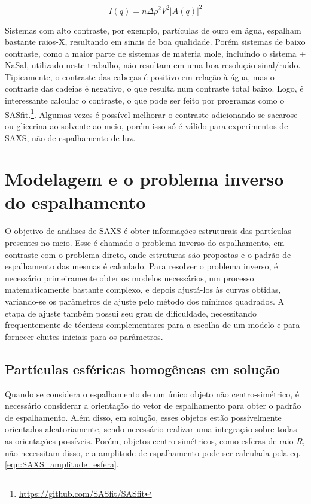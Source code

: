 		\begin{equation}
		I(q) = n\Delta \rho^2 V^2 |A(q)|^2
		\label{eqn:SAXS_I_funcao_A}
		\end{equation}
		
		Sistemas com alto contraste, por exemplo, partículas de ouro em água, espalham bastante raios-X, resultando em sinais de boa qualidade. Porém sistemas de baixo contraste, como a maior parte de sistemas de materia mole, incluindo o sistema \CTAB{} + NaSal, utilizado neste trabalho, não resultam em uma boa resolução sinal/ruído. Tipicamente, o contraste das cabeças é positivo em relação à água, mas o contraste das cadeias é negativo, o que resulta num contraste total baixo. Logo, é interessante calcular o contraste, o que pode ser feito por programas como o SASfit.\footnote{\url{https://github.com/SASfit/SASfit}}. Algumas vezes é possível melhorar o contraste adicionando-se sacarose ou glicerina ao solvente ao meio, porém isso só é válido para experimentos de SAXS, não de espalhamento de luz.
		
		\section{Modelagem e o problema inverso do espalhamento}
		
		O objetivo de análises de SAXS é obter informações estruturais das partículas presentes no meio. Esse é chamado o problema inverso do espalhamento, em contraste com o problema direto, onde estruturas são propostas e o padrão de espalhamento das mesmas é calculado. Para resolver o problema inverso, é necessário primeiramente obter os modelos necessários, um processo matematicamente bastante complexo, e depois ajustá-los às curvas obtidas, variando-se os parâmetros de ajuste pelo método dos mínimos quadrados. A etapa de ajuste também possui seu grau de dificuldade, necessitando frequentemente de técnicas complementares para a escolha de um modelo e para fornecer chutes iniciais para os parâmetros.
		
		\subsection{Partículas esféricas homogêneas em solução}
		
		Quando se considera o espalhamento de um único objeto não centro-simétrico, é necessário considerar a orientação do vetor de espalhamento \q{} para obter o padrão de espalhamento. Além disso, em solução, esses objetos estão possivelmente orientados aleatoriamente, sendo necessário realizar uma integração sobre todas as orientações possíveis. Porém, objetos centro-simétricos, como esferas de raio \(R\), não necessitam disso, e a amplitude de espalhamento pode ser calculada pela eq. \ref{eqn:SAXS_amplitude_esfera}. %
		
